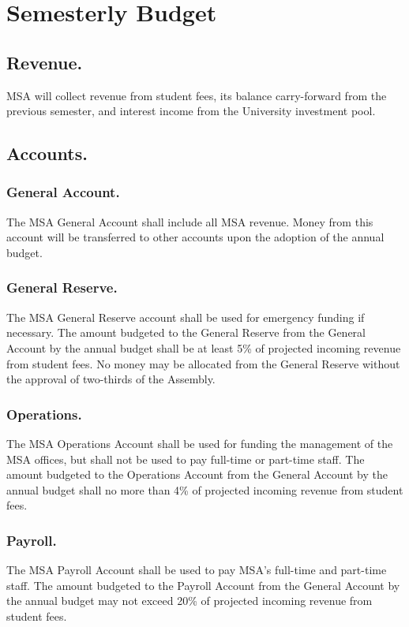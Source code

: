
\section{Semesterly Budget}

\subsection{Revenue.}
MSA will collect revenue from student fees, its balance carry-forward from the previous semester, and interest income from the University investment pool.  


\subsection{Accounts.}

\subsubsection{General Account.}
The MSA General Account shall include all MSA revenue.  Money from this account will be transferred to other accounts upon the adoption of the annual budget.

\subsubsection{General Reserve.}
The MSA General Reserve account shall be used for emergency funding if necessary.  The amount budgeted to the General Reserve from the General Account by the annual budget shall be at least 5\% of projected incoming revenue from student fees.  No money may be allocated from the General Reserve without the approval of two-thirds of the Assembly.

\subsubsection{Operations.}
The MSA Operations Account shall be used for funding the management of the MSA offices, but shall not be used to pay full-time or part-time staff.  The amount budgeted to the Operations Account from the General Account by the annual budget shall no more than 4\% of projected incoming revenue from student fees.

\subsubsection{Payroll.}
The MSA Payroll Account shall be used to pay MSA’s full-time and part-time staff.  The amount budgeted to the Payroll Account from the General Account by the annual budget may not exceed 20\% of projected incoming revenue from student fees.

